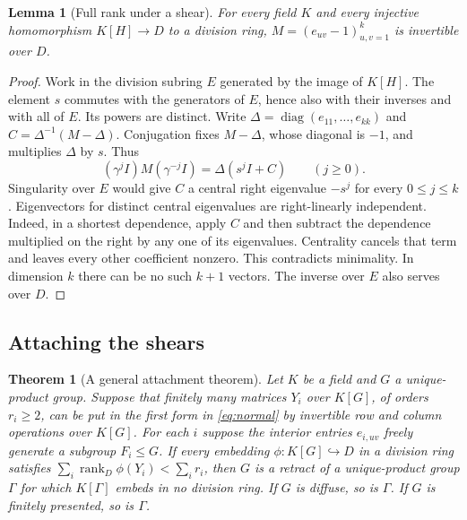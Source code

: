 \documentclass[11pt,a4paper]{article}
\newtheorem{lemma}[theorem]{Lemma}
\newtheorem{maintheorem}{Theorem}
\numberwithin{equation}{section}
\DeclareMathOperator{\rk}{rank}
\DeclareMathOperator{\diag}{diag}
\begin{document}
\begin{lemma}[Full rank under a shear]\label{lem:shear}
For every field \(K\) and every injective homomorphism \(K[H]\to D\) to a division ring, \(M=(e_{uv}-1)_{u,v=1}^k\) is invertible over \(D\).
\end{lemma}
\begin{proof}
Work in the division subring \(E\) generated by the image of \(K[H]\). The element \(s\) commutes with the generators of \(E\), hence also with their inverses and with all of \(E\). Its powers are distinct. Write \(\Delta=\diag(e_{11},\ldots,e_{kk})\) and \(C=\Delta^{-1}(M-\Delta)\). Conjugation fixes \(M-\Delta\), whose diagonal is \(-1\), and multiplies \(\Delta\) by \(s\). Thus
\begin{equation}\label{eq:iterated-shear}
           (\gamma^j I)M(\gamma^{-j} I)=\Delta(s^jI+C)\qquad(j\ge0).
\end{equation}
Singularity over \(E\) would give \(C\) a central right eigenvalue \(-s^j\) for every \(0\le j\le k\). Eigenvectors for distinct central eigenvalues are right-linearly independent. Indeed, in a shortest dependence, apply \(C\) and then subtract the dependence multiplied on the right by any one of its eigenvalues. Centrality cancels that term and leaves every other coefficient nonzero. This contradicts minimality. In dimension \(k\) there can be no such \(k+1\) vectors. The inverse over \(E\) also serves over \(D\).
\end{proof}

\subsection{Attaching the shears}
\begin{maintheorem}[A general attachment theorem]\label{thm:C}
Let \(K\) be a field and \(G\) a unique-product group. Suppose that finitely many matrices \(Y_i\) over \(K[G]\), of orders \(r_i\ge2\), can be put in the first form in \eqref{eq:normal} by invertible row and column operations over \(K[G]\). For each \(i\) suppose the interior entries \(e_{i,uv}\) freely generate a subgroup \(F_i\le G\). If every embedding \(\phi:K[G]\hookrightarrow D\) in a division ring satisfies \(\sum_i\rk_D\phi(Y_i)<\sum_i r_i\), then \(G\) is a retract of a unique-product group \(\Gamma\) for which \(K[\Gamma]\) embeds in no division ring. If \(G\) is diffuse, so is \(\Gamma\). If \(G\) is finitely presented, so is \(\Gamma\).
\end{maintheorem}
\end{document}
